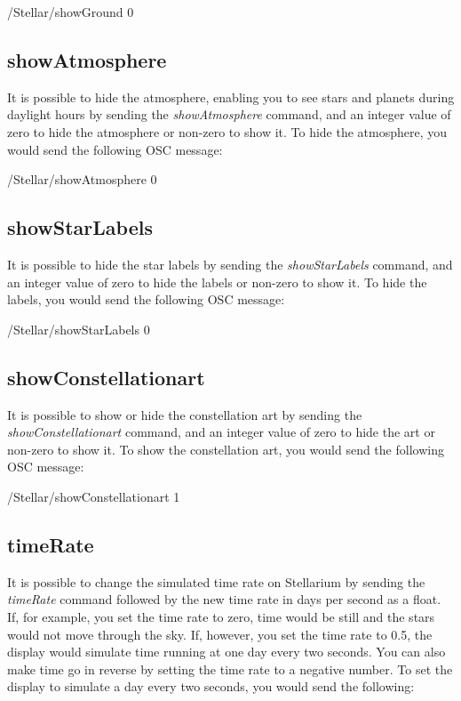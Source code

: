   \begin{syntax}	
 	\medskip
 	/Stellar/showGround 0
 	\medskip
 \end{syntax}

 \subsection{showAtmosphere }
It is possible to hide the atmosphere, enabling you to see stars and planets during daylight hours by sending the \textit{showAtmosphere} command, and an integer value of zero to hide the atmosphere or non-zero to show it. To hide the atmosphere, you would send the following OSC message:

\begin{syntax}	
	\medskip
	/Stellar/showAtmosphere 0
	\medskip
\end{syntax}

 \subsection{showStarLabels }
It is possible to hide the star labels  by sending the \textit{showStarLabels} command, and an integer value of zero to hide the labels or non-zero to show it. To hide the labels, you would send the following OSC message:

\begin{syntax}	
	\medskip
	/Stellar/showStarLabels 0
	\medskip
\end{syntax}

 \subsection{showConstellationart }
It is possible to show or hide the constellation art by sending the \textit{showConstellationart} command, and an integer value of zero to hide the art or non-zero to show it. To show the constellation art, you would send the following OSC message:

\begin{syntax}	
	\medskip
	/Stellar/showConstellationart 1
	\medskip
\end{syntax}

\subsection{timeRate}
It is possible to change the simulated time rate on Stellarium by sending the \textit{timeRate} command followed by the new time rate in days per second as a float. If, for example, you set the time rate to zero, time would be still and the stars would not move through the sky. If, however, you set the time rate to 0.5, the display would simulate time running at one day every two seconds. You can also make time go in reverse by setting the time rate to a negative number. To set the display to simulate a day every two seconds, you would send the following:

